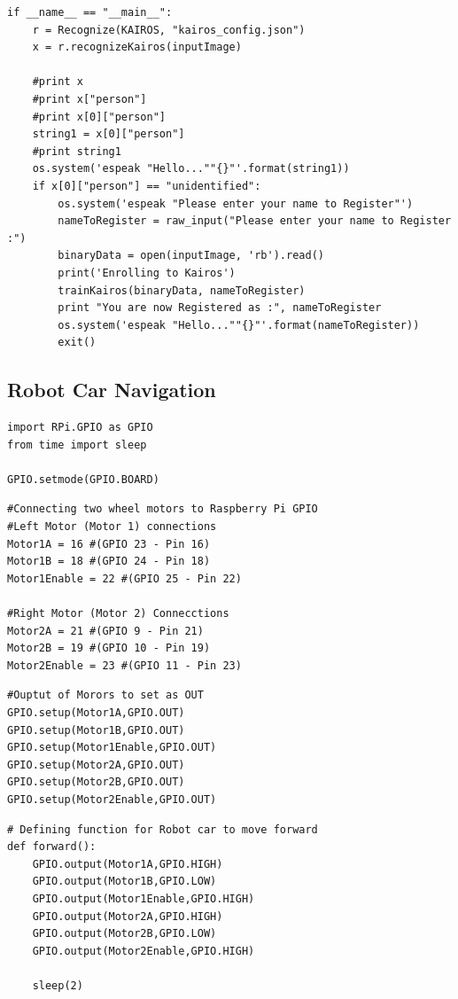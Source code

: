 \documentclass[sigconf]{acmart}
\begin{document}
\begin{lstlisting}
if __name__ == "__main__":
    r = Recognize(KAIROS, "kairos_config.json")
    x = r.recognizeKairos(inputImage)
    
    #print x
    #print x["person"]
    #print x[0]["person"]
    string1 = x[0]["person"]
    #print string1
    os.system('espeak "Hello...""{}"'.format(string1))
    if x[0]["person"] == "unidentified":
        os.system('espeak "Please enter your name to Register"')
        nameToRegister = raw_input("Please enter your name to Register :")
        binaryData = open(inputImage, 'rb').read()
        print('Enrolling to Kairos')
        trainKairos(binaryData, nameToRegister)
        print "You are now Registered as :", nameToRegister
        os.system('espeak "Hello...""{}"'.format(nameToRegister))
        exit()
\end{lstlisting}

\subsection{Robot Car Navigation}
\begin{lstlisting}
import RPi.GPIO as GPIO
from time import sleep

GPIO.setmode(GPIO.BOARD)
\end{lstlisting}

\begin{lstlisting}
#Connecting two wheel motors to Raspberry Pi GPIO 
#Left Motor (Motor 1) connections
Motor1A = 16 #(GPIO 23 - Pin 16)
Motor1B = 18 #(GPIO 24 - Pin 18)
Motor1Enable = 22 #(GPIO 25 - Pin 22)

#Right Motor (Motor 2) Connecctions
Motor2A = 21 #(GPIO 9 - Pin 21)
Motor2B = 19 #(GPIO 10 - Pin 19)
Motor2Enable = 23 #(GPIO 11 - Pin 23)
\end{lstlisting}

\begin{lstlisting}
#Ouptut of Morors to set as OUT
GPIO.setup(Motor1A,GPIO.OUT)
GPIO.setup(Motor1B,GPIO.OUT)
GPIO.setup(Motor1Enable,GPIO.OUT)
GPIO.setup(Motor2A,GPIO.OUT)
GPIO.setup(Motor2B,GPIO.OUT)
GPIO.setup(Motor2Enable,GPIO.OUT)

\end{lstlisting}

\begin{lstlisting}
# Defining function for Robot car to move forward
def forward():
	GPIO.output(Motor1A,GPIO.HIGH)
	GPIO.output(Motor1B,GPIO.LOW)
	GPIO.output(Motor1Enable,GPIO.HIGH) 
	GPIO.output(Motor2A,GPIO.HIGH)
	GPIO.output(Motor2B,GPIO.LOW)
	GPIO.output(Motor2Enable,GPIO.HIGH) 

	sleep(2)
\end{lstlisting}
\end{document}
